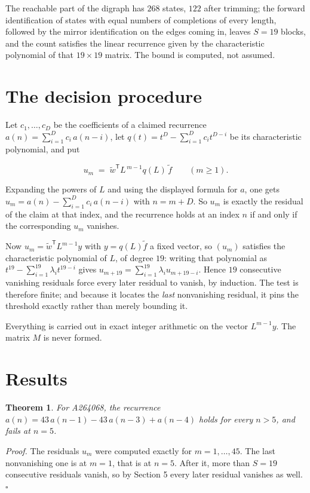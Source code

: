 \documentclass[11pt]{article}
\newtheorem{theorem}{Theorem}
\theoremstyle{definition}
\begin{document}
The reachable part of the digraph has $268$ states, $122$ after trimming; the forward identification of states with equal numbers of completions of every length, followed by the mirror identification on the edges coming in, leaves $S = 19$ blocks, and the count satisfies the linear recurrence given by the characteristic polynomial of that $19\times19$ matrix. The bound is computed, not assumed.

\section{The decision procedure}

Let $c_1,\dots,c_D$ be the coefficients of a claimed recurrence $a(n) = \sum_{i=1}^{D} c_i\,a(n-i)$, let $q(t) = t^{D} - \sum_{i=1}^{D} c_i t^{D-i}$ be its characteristic polynomial, and put

\[u_m \;=\; \tilde w^{\mathsf T} L^{\,m-1} q(L)\,\tilde f \qquad (m \ge 1).\]

Expanding the powers of $L$ and using the displayed formula for $a$, one gets $u_m = a(n) - \sum_{i=1}^{D} c_i\,a(n-i)$ with $n = m + D$. So $u_m$ is exactly the residual of the claim at that index, and the recurrence holds at an index $n$ if and only if the corresponding $u_m$ vanishes.

Now $u_m = \tilde w^{\mathsf T} L^{m-1} y$ with $y = q(L)\tilde f$ a fixed vector, so $(u_m)$ satisfies the characteristic polynomial of $L$, of degree $19$: writing that polynomial as $t^{19} - \sum_{i=1}^{19} \lambda_i t^{19-i}$ gives $u_{m+19} = \sum_{i=1}^{19} \lambda_i u_{m+19-i}$. Hence $19$ consecutive vanishing residuals force every later residual to vanish, by induction. The test is therefore finite; and because it locates the {\itshape last} nonvanishing residual, it pins the threshold exactly rather than merely bounding it.

Everything is carried out in exact integer arithmetic on the vector $L^{m-1}y$. The matrix $M$ is never formed.

\section{Results}

\begin{theorem} For A264068, the recurrence $a(n) = 43\,a(n-1) - 43\,a(n-3) + a(n-4)$ holds for every $n > 5$, and fails at $n = 5$.\end{theorem}

{\itshape Proof.} The residuals $u_m$ were computed exactly for $m = 1,\dots,45$. The last nonvanishing one is at $m = 1$, that is at $n = 5$. After it, more than $S = 19$ consecutive residuals vanish, so by Section 5 every later residual vanishes as well. $\square$
\end{document}

